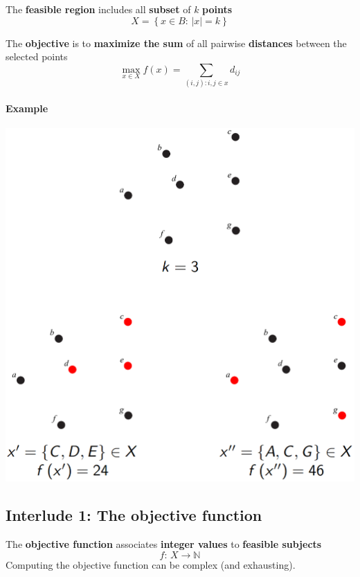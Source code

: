 The \textbf{feasible region} includes all \textbf{subset} of $k$ \textbf{points} 
$$ X = \left\{x \in B : \, |x| = k \right\}$$

The \textbf{objective} is to \textbf{maximize the sum} of all pairwise \textbf{distances} between the selected points
$$ \max_{x \in X} f(x) = \sum_{(i,j):i,j \in x} d_{ij}$$ 

\paragraph{Example}
\begin{center}
	\includegraphics[width=0.6\columnwidth]{img/MDP1}
\end{center}

\newpage

\subsection*{Interlude 1: The objective function}
The \textbf{objective function} associates \textbf{integer values} to \textbf{feasible subjects}
$$ f: \, X \rightarrow \mathbb{N} $$
Computing the objective function can be complex (and exhausting).\\

